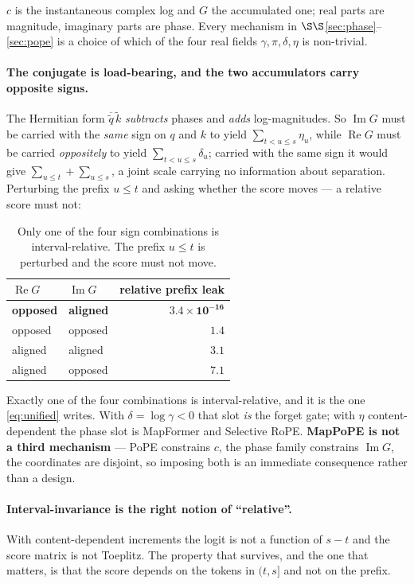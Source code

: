 \documentclass[11pt]{article}
\begin{document}
\noindent $c$ is the instantaneous complex log and $G$ the accumulated one; real
parts are magnitude, imaginary parts are phase. Every mechanism in
$\S\S$\ref{sec:phase}--\ref{sec:pope} is a choice of which of the four real fields
$\gamma, \pi, \delta, \eta$ is non-trivial.

\paragraph{The conjugate is load-bearing, and the two accumulators carry opposite
signs.} The Hermitian form $\overline{\tilde q}\,\tilde k$ \emph{subtracts} phases
and \emph{adds} log-magnitudes. So $\operatorname{Im}G$ must be carried with the
\emph{same} sign on $q$ and $k$ to yield $\sum_{t<u\le s}\eta_u$, while
$\operatorname{Re}G$ must be carried \emph{oppositely} to yield
$\sum_{t<u\le s}\delta_u$; carried with the same sign it would give
$\sum_{u\le t} + \sum_{u\le s}$, a joint scale carrying no information about
separation. Perturbing the prefix $u\le t$ and asking whether the score moves --- a
relative score must not:

\begin{table}[htbp]\centering\small
\caption{Only one of the four sign combinations is interval-relative. The prefix $u\le t$ is perturbed and the score must not move.}
\label{tab:signs}
\begin{tabular}{llr}
\toprule
$\operatorname{Re}G$ & $\operatorname{Im}G$ & relative prefix leak \\
\midrule
\textbf{opposed} & \textbf{aligned} & $\mathbf{3.4\times10^{-16}}$ \\
opposed & opposed & $1.4$ \\
aligned & aligned & $3.1$ \\
aligned & opposed & $7.1$ \\
\bottomrule
\end{tabular}
\end{table}

\noindent Exactly one of the four combinations is interval-relative, and it is the
one \eqref{eq:unified} writes. With $\delta = \log\gamma < 0$ that slot \emph{is} the
forget gate; with $\eta$ content-dependent the phase slot is MapFormer and Selective
RoPE. \textbf{MapPoPE is not a third mechanism} --- PoPE constrains $c$, the phase
family constrains $\operatorname{Im}G$, the coordinates are disjoint, so imposing
both is an immediate consequence rather than a design.

\paragraph{Interval-invariance is the right notion of ``relative''.} With
content-dependent increments the logit is not a function of $s-t$ and the score
matrix is not Toeplitz. The property that survives, and the one that matters, is
that the score depends on the tokens in $(t,s]$ and not on the prefix.
\end{document}
